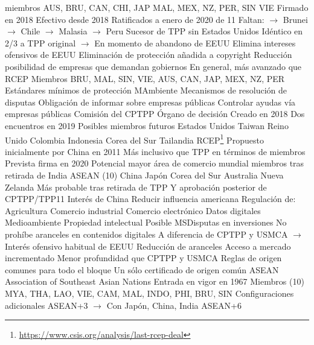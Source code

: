 \documentclass{nuevotema}
\begin{document}
\begin{esquemal}
				 miembros
				\4[] AUS, BRU, CAN, CHI, JAP
				\4[] MAL, MEX, NZ, PER, SIN
				\4[] VIE
				\4 Firmado en 2018
				\4 Efectivo desde 2018
				\4 Ratificados a enero de 2020
				 de 11
				\4[] Faltan:
				\4[] $\to$ Brunei
				\4[] $\to$ Chile
				\4[] $\to$ Malasia
				\4[] $\to$ Peru
				\4 Sucesor de TPP sin Estados Unidos
				\4[] Idéntico en 2/3 a TPP original
				\4[] $\to$ En momento de abandono de EEUU
				\4 Elimina intereses ofensivos de EEUU
				\4[] Eliminación de protección añadida a copyright
				\4[] Reducción posibilidad de empresas que demandan gobiernos
				\4 En general, más avanzado que RCEP
				\4 Miembros
				\4[] BRU, MAL, SIN, VIE, AUS, CAN, JAP,
				\4[] MEX, NZ, PER
				\4 Estándares mínimos de protección MAmbiente
				\4 Mecanismos de resolución de disputas
				\4 Obligación de informar sobre empresas públicas
				\4[] Controlar ayudas vía empresas públicas
				\4 Comisión del CPTPP
				\4[] Órgano de decisión
				\4[] Creado en 2018
				\4[] Dos encuentros en 2019
				\4 Posibles miembros futuros
				\4[] Estados Unidos
				\4[] Taiwan
				\4[] Reino Unido
				\4[] Colombia
				\4[] Indonesia
				\4[] Corea del Sur
				\4[] Tailandia
			\3 RCEP\footnote{\url{https://www.csis.org/analysis/last-rcep-deal}}
				\4 Propuesto inicialmente por China en 2011
				\4[] Más inclusivo que TPP en términos de miembros
				\4 Prevista firma en 2020
				\4 Potencial mayor área de comercio mundial
				 miembros tras retirada de India
				\4[] ASEAN (10)
				\4[] China
				\4[] Japón
				\4[] Corea del Sur
				\4[] Australia
				\4[] Nueva Zelanda
				\4 Más probable tras retirada de TPP
				\4[] Y aprobación posterior de CPTPP/TPP11
				\4 Interés de China
				\4[] Reducir influencia americana
				\4 Regulación de:
				\4[] Agricultura
				\4[] Comercio industrial
				\4[] Comercio electrónico
				\4[] Datos digitales
				\4[] Medioambiente
				\4[] Propiedad intelectual
				\4 Posible MSDisputas en inversiones
				\4 No prohíbe aranceles en contenidos digitales
				\4[] A diferencia de CPTPP y USMCA
				\4[] $\to$ Interés ofensivo habitual de EEUU
				\4 Reducción de aranceles
				\4 Acceso a mercado incrementado
				\4 Menor profundidad que CPTPP y USMCA
				\4 Reglas de origen comunes para todo el bloque
				\4[] Un sólo certificado de origen común
			\3 ASEAN
				\4 Association of Southeast Asian Nations
				\4 Entrada en vigor en 1967
				\4 Miembros (10)
				\4[] MYA, THA, LAO, VIE, CAM,
				\4[] MAL, INDO, PHI, BRU, SIN
				\4 Configuraciones adicionales
				\4[] ASEAN+3
				\4[] $\to$ Con Japón, China, India
				\4[] ASEAN+6

\end{esquemal}
\end{document}
